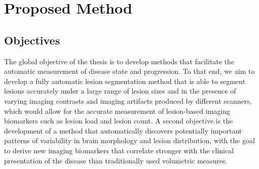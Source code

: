 % 

\section[Proposed method]{Proposed Method}

\subsection{Objectives}


The global objective of the thesis is to develop methods that facilitate the
automatic measurement of disease state and progression. To that end, we aim to
develop a fully automatic lesion segmentation method that is able to segment
lesions accurately under a large range of lesion sizes and in the presence of
varying imaging contrasts and imaging artifacts produced by different scanners,
which would allow for the accurate measurement of lesion-based imaging
biomarkers such as lesion load and lesion count. A second objective is the
development of a method that automatically discovers potentially important
patterns of variability in brain morphology and lesion distribution, with the
goal to derive new imaging biomarkers that correlate stronger with the clinical
presentation of the disease than traditionally used volumetric measures.

